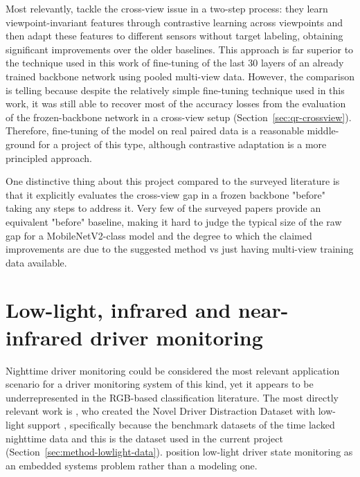 Most relevantly, \citet{bhalla2025crossview} tackle the cross-view issue in a two-step process: they learn viewpoint-invariant features through contrastive learning across viewpoints and then adapt these features to different sensors without target labeling, obtaining significant improvements over the older baselines. This approach is far superior to the technique used in this work of fine-tuning of the last 30 layers of an already trained backbone network using pooled multi-view data. However, the comparison is telling because despite the relatively simple fine-tuning technique used in this work, it was still able to recover most of the accuracy losses from the evaluation of the frozen-backbone network in a cross-view setup (Section~\ref{sec:qr-crossview}). Therefore, fine-tuning of the model on real paired data is a reasonable middle-ground for a project of this type, although contrastive adaptation is a more principled approach.

One distinctive thing about this project compared to the surveyed literature is that it explicitly evaluates the cross-view gap in a frozen backbone "before" taking any steps to address it. Very few of the surveyed papers provide an equivalent "before" baseline, making it hard to judge the typical size of the raw gap for a MobileNetV2-class model and the degree to which the claimed improvements are due to the suggested method vs just having multi-view training data available.

\section{Low-light, infrared and near-infrared driver monitoring}
\label{sec:lit-lowlight}

Nighttime driver monitoring could be considered the most relevant application scenario for a driver monitoring system of this kind, yet it appears to be underrepresented in the RGB-based classification literature. The most directly relevant work is \citet{saad2020lowlight}, who created the Novel Driver Distraction Dataset with low-light support \citep{saad2020dataset}, specifically because the benchmark datasets of the time lacked nighttime data and this is the dataset used in the current project (Section~\ref{sec:method-lowlight-data}). \citet{janveja2020insight} position low-light driver state monitoring as an embedded systems problem rather than a modeling one.

